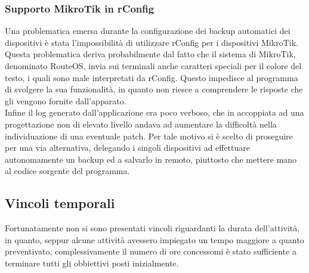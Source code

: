 \documentclass[Tesi.tex]{subfiles}
\begin{document}
\subsubsection{Supporto MikroTik in rConfig}
Una problematica emersa durante la configurazione dei backup automatici dei dispositivi è stata l'impossibilità di utilizzare rConfig per i dispositivi MikroTik. \\
Questa problematica deriva probabilmente dal fatto che il sistema di MikroTik, denominato RouteOS, invia sui terminali anche caratteri speciali per il colore del testo, i quali sono male interpretati da rConfig. Questo impedisce al programma di svolgere la sua funzionalità, in quanto non riesce a comprendere le risposte che gli vengono fornite dall'apparato. \\
Infine il log generato dall'applicazione era poco verboso, che in accoppiata ad una progettazione non di elevato livello andava ad aumentare la difficoltà nella individuazione di una eventuale patch. Per tale motivo si è scelto di proseguire per una via alternativa, delegando i singoli dispositivi ad effettuare autonomamente un backup ed a salvarlo in remoto, piuttosto che mettere mano al codice sorgente del programma.

\subsection{Vincoli temporali}
Fortunatamente non si sono presentati vincoli riguardanti la durata dell'attività, in quanto, seppur alcune attività avessero impiegato un tempo maggiore a quanto preventivato, complessivamente il numero di ore concessomi è stato sufficiente a terminare tutti gli obbiettivi posti inizialmente.
\end{document}
